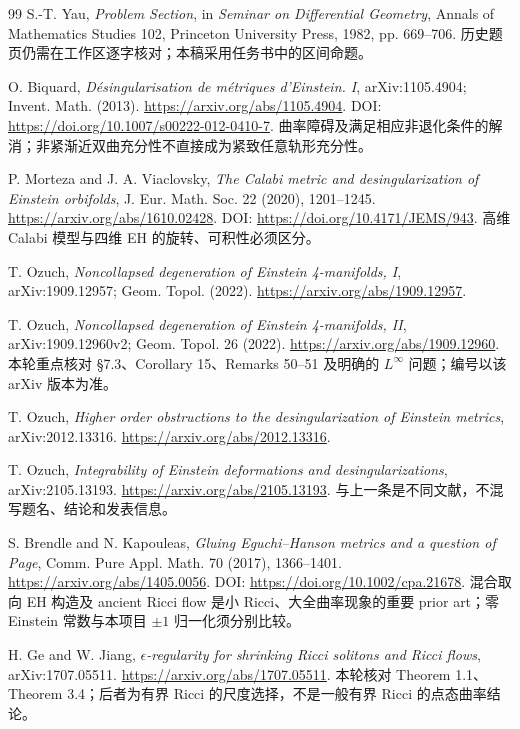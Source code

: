 \documentclass[UTF8,a4paper,11pt,fontset=fandol]{ctexart}
\numberwithin{equation}{section}
\theoremstyle{definition}
\begin{document}
\begin{thebibliography}{99}
 S.-T. Yau, \emph{Problem Section}, in \emph{Seminar on Differential Geometry}, Annals of Mathematics Studies 102, Princeton University Press, 1982, pp. 669--706. 历史题页仍需在工作区逐字核对；本稿采用任务书中的区间命题。

 O. Biquard, \emph{D\'esingularisation de m\'etriques d'Einstein. I}, arXiv:1105.4904; Invent. Math. (2013). \url{https://arxiv.org/abs/1105.4904}. DOI: \url{https://doi.org/10.1007/s00222-012-0410-7}. 曲率障碍及满足相应非退化条件的解消；非紧渐近双曲充分性不直接成为紧致任意轨形充分性。

 P. Morteza and J. A. Viaclovsky, \emph{The Calabi metric and desingularization of Einstein orbifolds}, J. Eur. Math. Soc. 22 (2020), 1201--1245. \url{https://arxiv.org/abs/1610.02428}. DOI: \url{https://doi.org/10.4171/JEMS/943}. 高维 Calabi 模型与四维 EH 的旋转、可积性必须区分。

 T. Ozuch, \emph{Noncollapsed degeneration of Einstein 4-manifolds, I}, arXiv:1909.12957; Geom. Topol. (2022). \url{https://arxiv.org/abs/1909.12957}.

 T. Ozuch, \emph{Noncollapsed degeneration of Einstein 4-manifolds, II}, arXiv:1909.12960v2; Geom. Topol. 26 (2022). \url{https://arxiv.org/abs/1909.12960}. 本轮重点核对 \S7.3、Corollary 15、Remarks 50--51 及明确的 $L^\infty$ 问题；编号以该 arXiv 版本为准。

 T. Ozuch, \emph{Higher order obstructions to the desingularization of Einstein metrics}, arXiv:2012.13316. \url{https://arxiv.org/abs/2012.13316}.

 T. Ozuch, \emph{Integrability of Einstein deformations and desingularizations}, arXiv:2105.13193. \url{https://arxiv.org/abs/2105.13193}. 与上一条是不同文献，不混写题名、结论和发表信息。

 S. Brendle and N. Kapouleas, \emph{Gluing Eguchi--Hanson metrics and a question of Page}, Comm. Pure Appl. Math. 70 (2017), 1366--1401. \url{https://arxiv.org/abs/1405.0056}. DOI: \url{https://doi.org/10.1002/cpa.21678}. 混合取向 EH 构造及 ancient Ricci flow 是小 Ricci、大全曲率现象的重要 prior art；零 Einstein 常数与本项目 $\pm1$ 归一化须分别比较。

 H. Ge and W. Jiang, \emph{$\epsilon$-regularity for shrinking Ricci solitons and Ricci flows}, arXiv:1707.05511. \url{https://arxiv.org/abs/1707.05511}. 本轮核对 Theorem 1.1、Theorem 3.4；后者为有界 Ricci 的尺度选择，不是一般有界 Ricci 的点态曲率结论。


\end{thebibliography}
\end{document}
